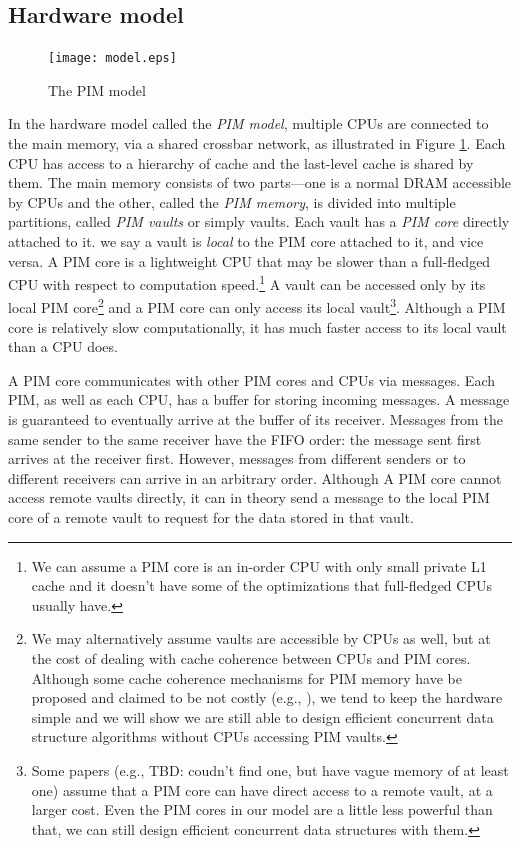 \documentclass[11pt]{article}
\begin{document}
\subsection{Hardware model}
\label{section:hardware_model}

\begin{figure}[ht!]
\centering
\texttt{[image: model.eps]}
\caption{The PIM model}
\label{figure:model}
\end{figure}


In the hardware model called the \emph{PIM model}, multiple CPUs are connected to the main
memory, via a shared crossbar network, as illustrated in Figure \ref{figure:model}.
Each CPU has access to a hierarchy of cache and
the last-level cache is shared by them. 
The main memory consists of two parts---one is a normal DRAM accessible by CPUs 
and the other, called the \emph{PIM memory}, is divided into multiple partitions, 
called \emph{PIM vaults} or simply vaults.  
Each vault has a \emph{PIM core} directly attached to it.
we say a vault is \emph{local} to the PIM core attached to it, and vice versa.
A PIM core is a lightweight CPU that may be slower than a full-fledged CPU
with respect to computation speed.\footnote{
We can assume a PIM core is an in-order CPU with only small private L1 cache and 
it doesn't have some of the optimizations that full-fledged CPUs usually have.}
A vault can be accessed only by its local PIM core\footnote{
We may alternatively assume vaults are accessible by CPUs as well, 
but at the cost of dealing with cache coherence between CPUs and PIM cores. 
Although some cache coherence mechanisms for PIM memory have be proposed 
and claimed to be not costly (e.g., \cite{boroumand2016}), 
we tend to keep the hardware simple and we will show we are still able to 
design efficient concurrent data structure algorithms without CPUs accessing PIM vaults. }
and a PIM core can only access its local vault\footnote{
Some papers (e.g., \cite{} TBD: coudn't find one, but have vague memory of at least one) 
assume that a PIM core can have direct access to a remote vault,
at a larger cost. Even the PIM cores in our model are a little less powerful than that,
we can still design efficient concurrent data structures with them.}.
Although a PIM core is relatively slow computationally,
it has much faster access to its local vault than a CPU does.

A PIM core communicates with other PIM cores and CPUs via messages.
Each PIM, as well as each CPU, has a buffer for storing incoming messages.
A message is guaranteed to eventually arrive at the buffer of its receiver.
Messages from the same sender to the same receiver have the FIFO order: 
the message sent first arrives at the receiver first. 
However, messages from different senders or to different receivers can arrive in an arbitrary order. 
Although A PIM core cannot access remote vaults directly, it can in theory send a message
to the local PIM core of a remote vault to request for the data stored in that vault.
\end{document}
